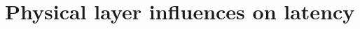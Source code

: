 \documentclass[IN,11pt,twoside,openright,idp,english]{tumthesis}
\begin{document}





\section{Physical layer influences on latency}


\end{document}
